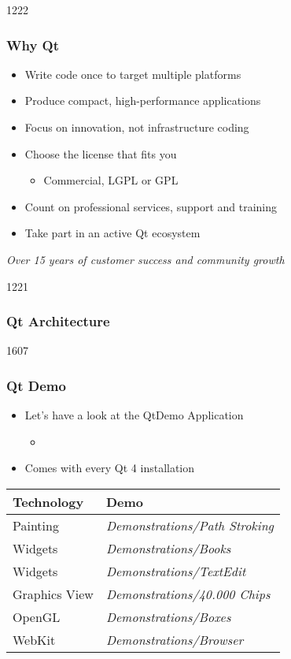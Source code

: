 \begin{slide}{1222}
  \frametitle{Why Qt}
  \begin{itemize}
  \item Write code once to target multiple platforms
  \item Produce compact, high-performance applications
  \item Focus on innovation, not infrastructure coding
  \item Choose the license that fits you
    \begin{itemize}
    \item Commercial, LGPL or GPL
    \end{itemize}
  \item Count on professional services, support and training
  \item Take part in an active Qt ecosystem
  \end{itemize}
  \vspace{1cm}
  \begin{block}{} {
      \textit{Over 15 years of customer success and community growth}
    }
  \end{block}
\end{slide}

\begin{slide}{1221}
  \frametitle{Qt Architecture}
\end{slide}

\begin{slide}{1607}
  \frametitle{Qt Demo}
  \begin{itemize}
  \item Let's have a look at the QtDemo Application
   \begin{itemize}
    \item {}
    \end{itemize}
  \item Comes with every Qt 4 installation
 \end{itemize}
\medskip
\begin{tabular}{l|l}
    \textbf{Technology} & \textbf{Demo} \\ \hline
    Painting & \textit{Demonstrations/Path Stroking} \\\hline
    Widgets & \textit{Demonstrations/Books} \\\hline
    Widgets & \textit{Demonstrations/TextEdit} \\\hline
    Graphics View &\textit{Demonstrations/40.000 Chips} \\\hline
    OpenGL & \textit{Demonstrations/Boxes} \\\hline
    WebKit & \textit{Demonstrations/Browser} \\\hline
  \end{tabular}
\end{slide}
